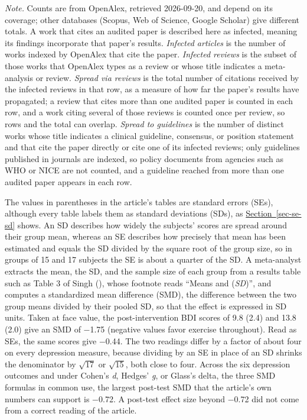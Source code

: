 \documentclass[
  letterpaper,
  DIV=11,
  numbers=noendperiod]{scrartcl}
\newenvironment{acetablenote}{\par\small\color{acegrey}\setlength{\parindent}{0pt}\noindent\ignorespaces}{\par}
\begin{document}
\begin{acetablenote}
\emph{Note.} Counts are from OpenAlex, retrieved 2026-09-20, and depend on its coverage; other databases (Scopus, Web of Science, Google Scholar) give different totals. A work that cites an audited paper is described here as infected, meaning its findings incorporate that paper's results. \emph{Infected articles} is the number of works indexed by OpenAlex that cite the paper. \emph{Infected reviews} is the subset of those works that OpenAlex types as a review or whose title indicates a meta-analysis or review. \emph{Spread via reviews} is the total number of citations received by the infected reviews in that row, as a measure of how far the paper's results have propagated; a review that cites more than one audited paper is counted in each row, and a work citing several of those reviews is counted once per review, so rows and the total can overlap. \emph{Spread to guidelines} is the number of distinct works whose title indicates a clinical guideline, consensus, or position statement and that cite the paper directly or cite one of its infected reviews; only guidelines published in journals are indexed, so policy documents from agencies such as WHO or NICE are not counted, and a guideline reached from more than one audited paper appears in each row.
\end{acetablenote}

The values in parentheses in the article's tables are standard errors
(SEs), although every table labels them as standard deviations (SDs), as
\hyperref[sec-se-sd]{Section~\ref*{sec-se-sd}} shows. An SD describes
how widely the subjects' scores are spread around their group mean,
whereas an SE describes how precisely that mean has been estimated and
equals the SD divided by the square root of the group size, so in groups
of 15 and 17 subjects the SE is about a quarter of the SD. A
meta-analyst extracts the mean, the SD, and the sample size of each
group from a results table such as Table 3 of Singh
(), whose footnote reads ``Means and
(\emph{SD})'', and computes a standardized mean difference (SMD), the
difference between the two group means divided by their pooled SD, so
that the effect is expressed in SD units. Taken at face value, the
post-intervention BDI scores of 9.8 (2.4) and 13.8 (2.0) give an SMD of
−1.75 (negative values favor exercise throughout). Read as SEs, the same
scores give −0.44. The two readings differ by a factor of about four on
every depression measure, because dividing by an SE in place of an SD
shrinks the denominator by \(\sqrt{17}\) or \(\sqrt{15}\), both close to
four. Across the six depression outcomes and under Cohen's \emph{d},
Hedges' \emph{g}, or Glass's delta, the three SMD formulas in common
use, the largest post-test SMD that the article's own numbers can
support is −0.72. A post-test effect size beyond −0.72 did not come from
a correct reading of the article.
\end{document}
